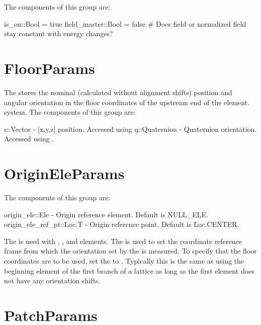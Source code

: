 The components of this group are:
\begin{example}
  is_on::Bool = true
  field_master::Bool = false         # Does field or normalized field stay constant with energy changes?
\end{example}

\section{FloorParams}
\label{s:orientation.g}

The  stores the nominal (calculated without alignment shifts) 
position and angular orientation in the floor coordinates of the upstream end of the element.
system. The components of this group are:
\begin{example}
  r::Vector          - [x,y,z] position. Accessed using 
  q::Quaternion      - Quaternion orientation. Accessed using .
\end{example}




\section{OriginEleParams}
\label{s:origin.ele.g}

The components of this group are:
\begin{example}
  origin_ele::Ele           - Origin reference element. Default is NULL_ELE.
  origin_ele_ref_pt::Loc.T  - Origin reference point. Default is Loc.CENTER. 
\end{example}

The  is used with , , and  elements.
The  is used to set the coordinate reference frame from which 
the orientation set by the  is measured. To specify that the floor coordinates are
to be used, set the  to . Typically this is the same as using the
beginning element of the first branch of a lattice as long as the first element does not have
any orientation shifts.


\section{PatchParams}
\label{s:patch.g}


